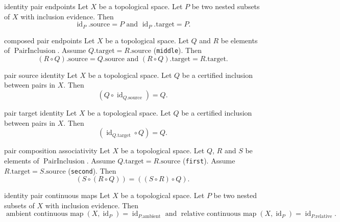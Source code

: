 \begin{cleanresult}{identity pair endpoints}
Let $X$ be a topological space.
Let $P$ be two nested subsets of $X$ with inclusion evidence.
Then \[\operatorname{id}_{P}.\mathrm{source}=P\text{ and }\operatorname{id}_{P}.\mathrm{target}=P.\]
\end{cleanresult}

\begin{cleanresult}{composed pair endpoints}
Let $X$ be a topological space.
Let $Q$ and $R$ be elements of $\operatorname{PairInclusion}$.
Assume $Q.\mathrm{target}=R.\mathrm{source}$ (\texttt{middle}).
Then \[\left(R\circ Q\right).\mathrm{source}=Q.\mathrm{source}\text{ and }\left(R\circ Q\right).\mathrm{target}=R.\mathrm{target}.\]
\end{cleanresult}

\begin{cleanresult}{pair source identity}
Let $X$ be a topological space.
Let $Q$ be a certified inclusion between pairs in $X$.
Then \[\left(Q\circ \operatorname{id}_{Q.\mathrm{source}}\right)=Q.\]
\end{cleanresult}

\begin{cleanresult}{pair target identity}
Let $X$ be a topological space.
Let $Q$ be a certified inclusion between pairs in $X$.
Then \[\left(\operatorname{id}_{Q.\mathrm{target}}\circ Q\right)=Q.\]
\end{cleanresult}

\begin{cleanresult}{pair composition associativity}
Let $X$ be a topological space.
Let $Q$, $R$ and $S$ be elements of $\operatorname{PairInclusion}$.
Assume $Q.\mathrm{target}=R.\mathrm{source}$ (\texttt{first}).
Assume $R.\mathrm{target}=S.\mathrm{source}$ (\texttt{second}).
Then \[\left(S\circ \left(R\circ Q\right)\right)=\left(\left(S\circ R\right)\circ Q\right).\]
\end{cleanresult}

\begin{cleanresult}{identity pair continuous maps}
Let $X$ be a topological space.
Let $P$ be two nested subsets of $X$ with inclusion evidence.
Then \[\operatorname{ambient\ continuous\ map}(X, \operatorname{id}_{P})=\operatorname{id}_{P.\mathrm{ambient}}\text{ and }\operatorname{relative\ continuous\ map}(X, \operatorname{id}_{P})=\operatorname{id}_{P.\mathrm{relative}}.\]
\end{cleanresult}

